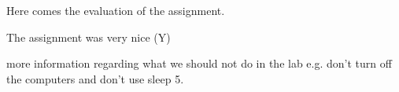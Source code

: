 Here comes the evaluation of the assignment.

The assignment was very nice (Y)

more information regarding what we should not do in the lab
e.g. don't turn off the computers and don't use sleep 5.